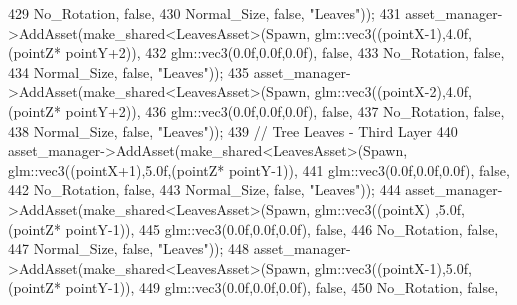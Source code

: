 \begin{DoxyCode}
429                                                              No\_Rotation, \textcolor{keyword}{false},
430                                                              Normal\_Size, \textcolor{keyword}{false}, \textcolor{stringliteral}{"Leaves"}));
431             asset\_manager->AddAsset(make\_shared<LeavesAsset>(Spawn, glm::vec3((pointX-1),4.0f,(pointZ*
      pointY+2)),
432                                                              glm::vec3(0.0f,0.0f,0.0f), \textcolor{keyword}{false},
433                                                              No\_Rotation, \textcolor{keyword}{false},
434                                                              Normal\_Size, \textcolor{keyword}{false}, \textcolor{stringliteral}{"Leaves"}));
435             asset\_manager->AddAsset(make\_shared<LeavesAsset>(Spawn, glm::vec3((pointX-2),4.0f,(pointZ*
      pointY+2)),
436                                                              glm::vec3(0.0f,0.0f,0.0f), \textcolor{keyword}{false},
437                                                              No\_Rotation, \textcolor{keyword}{false},
438                                                              Normal\_Size, \textcolor{keyword}{false}, \textcolor{stringliteral}{"Leaves"}));
439             \textcolor{comment}{// Tree Leaves - Third Layer}
440             asset\_manager->AddAsset(make\_shared<LeavesAsset>(Spawn, glm::vec3((pointX+1),5.0f,(pointZ*
      pointY-1)),
441                                                              glm::vec3(0.0f,0.0f,0.0f), \textcolor{keyword}{false},
442                                                              No\_Rotation, \textcolor{keyword}{false},
443                                                              Normal\_Size, \textcolor{keyword}{false}, \textcolor{stringliteral}{"Leaves"}));
444             asset\_manager->AddAsset(make\_shared<LeavesAsset>(Spawn, glm::vec3((pointX)  ,5.0f,(pointZ*
      pointY-1)),
445                                                              glm::vec3(0.0f,0.0f,0.0f), \textcolor{keyword}{false},
446                                                              No\_Rotation, \textcolor{keyword}{false},
447                                                              Normal\_Size, \textcolor{keyword}{false}, \textcolor{stringliteral}{"Leaves"}));
448             asset\_manager->AddAsset(make\_shared<LeavesAsset>(Spawn, glm::vec3((pointX-1),5.0f,(pointZ*
      pointY-1)),
449                                                              glm::vec3(0.0f,0.0f,0.0f), \textcolor{keyword}{false},
450                                                              No\_Rotation, \textcolor{keyword}{false},

\end{DoxyCode}
